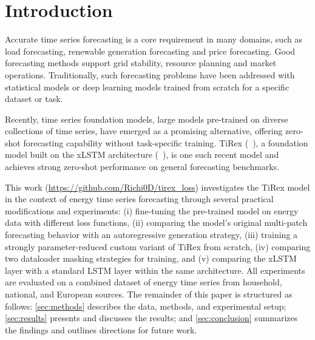 \documentclass[a4paper,oneside,10pt,ngerman,english]{scrartcl}
\begin{document}


\cleardoubleoddpage

\section{Introduction}
\label{sec:introduction}

Accurate time series forecasting is a core requirement in many domains, such as load forecasting, renewable generation forecasting and price forecasting. Good forecasting methods support grid stability, resource planning and market operations. Traditionally, such forecasting problems have been addressed with statistical models or deep learning models trained from scratch for a specific dataset or task.

Recently, time series foundation models, large models pre-trained on diverse collections of time series, have emerged as a promising alternative, offering zero-shot forecasting capability without task-specific training. TiRex (\citeauthor{auer2025tirexzeroshotforecastinglong}~\cite{auer2025tirexzeroshotforecastinglong}), a foundation model built on the xLSTM architecture (\citeauthor{beck2024xlstmextendedlongshortterm}~\cite{beck2024xlstmextendedlongshortterm}), is one such recent model and achieves strong zero-shot performance on general forecasting benchmarks. 

This work (\url{https://github.com/Richi0D/tirex_loss}) investigates the TiRex model in the context of energy time series forecasting through several practical modifications and experiments: (i) fine-tuning the pre-trained model on energy data with different loss functions, (ii) comparing the model's original multi-patch forecasting behavior with an autoregressive generation strategy, (iii) training a strongly parameter-reduced custom variant of TiRex from scratch, (iv) comparing two dataloader masking strategies for training, and (v) comparing the xLSTM layer with a standard LSTM layer within the same architecture. All experiments are evaluated on a combined dataset of energy time series from household, national, and European sources. The remainder of this paper is structured as follows: \autoref{sec:methods} describes the data, methods, and experimental setup; \autoref{sec:results} presents and discusses the results; and \autoref{sec:conclusion} summarizes the findings and outlines directions for future work.
\end{document}
